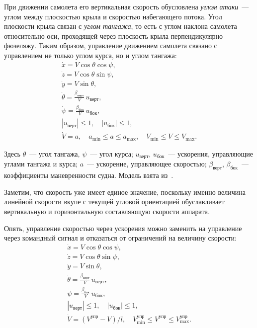 \documentclass[a4paper,12pt]{article}
\begin{document}
При движении самолета его вертикальная скорость обусловлена \textit{углом атаки}~--- углом между плоскостью крыла и скоростью набегающего потока. Угол плоскости крыла связан с \textit{углом тангажа}, то есть с углом наклона самолета относительно оси, проходящей через плоскость крыла перпендикулярно фюзеляжу. Таким образом, управление движением самолета связано с управлением не только углом курса, но и углом тангажа:
\begin{equation*}
  \begin{array}{l}
    \dot x = V \cos \theta \cos \psi, \\[0.75ex]
    \dot z = V \cos \theta \sin \psi, \\[0.75ex]
    \dot y = V \sin \theta, \\[0.75ex]
    \dot \theta = \frac{\beta_\text{верт}}{V} \, u_\text{верт}, \\[0.75ex]
    \dot \psi   = \frac{\beta_\text{бок}}{V} \, u_\text{бок}, \\[0.75ex]
    |u_\text{верт}| \leqslant 1, 
      \quad |u_\text{бок}| \leqslant 1, \\[0.75ex]
    \dot V = a, \quad  
      a_{\min} \leqslant a \leqslant a_{\max},
      \quad V_{\min} \leqslant V \leqslant V_{\max}.
  \end{array}
\end{equation*}

Здесь $\theta$~--- угол тангажа, $\psi$~--- угол курса; $u_\text{верт}$, $u_\text{бок}$~--- ускорения, управляющие углами тангажа и курса; $a$~--- ускорение, управляющее скоростью; $\beta_\text{верт}$, $\beta_\text{бок}$~--- коэффициенты маневренности судна. Модель взята из~\cite{bib:GOST}.

Заметим, что скорость уже имеет единое значение, поскольку именно величина линейной скорости вкупе с текущей угловой ориентацией обуславливает вертикальную и горизонтальную составляющую скорости аппарата.

Опять, управление скоростью через ускорения можно заменить на управление через командный сигнал и отказаться от ограничений на величину скорости:
\begin{equation*}
  \begin{array}{l}
    \dot x = V \cos \theta \cos \psi, \\[0.75ex]
    \dot z = V \cos \theta \sin \psi, \\[0.75ex]
    \dot y = V \sin \theta, \\[0.75ex]
    \dot \theta = \frac{\beta_\text{верт}}{V} \, u_\text{верт}, \\[0.75ex]
    \dot \psi   = \frac{\beta_\text{бок}}{V} \, u_\text{бок}, \\[0.75ex]
    |u_\text{верт}| \leqslant 1, 
      \quad |u_\text{бок}| \leqslant 1, \\[0.75ex]
    \dot V = (V^\text{упр} - V) / l, \quad  
      V^\text{упр}_{\min} \leqslant V^\text{упр} \leqslant V^\text{упр}_{\max}.
  \end{array}
\end{equation*}
\end{document}
